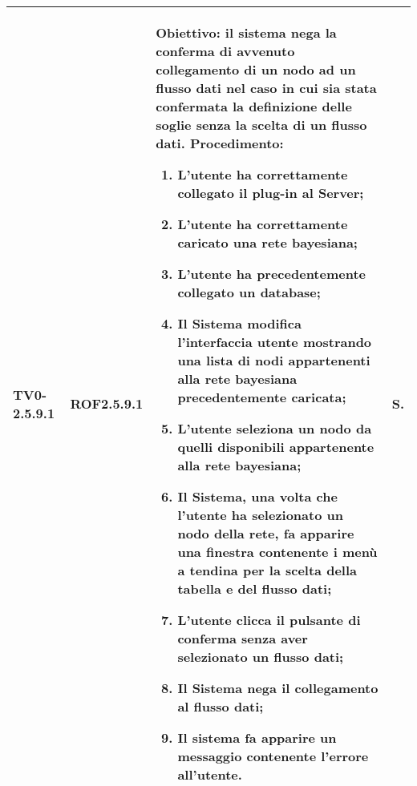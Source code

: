 \begin{longtable}{|C{.15\textwidth}|C{.13\textwidth}|m{.65\textwidth}|C{.08\textwidth}|}
TV0-2.5.9.1 & ROF2.5.9.1  &
	\textbf{Obiettivo}: il sistema nega la conferma di avvenuto collegamento di un nodo ad un flusso dati nel caso in cui sia stata confermata la definizione delle soglie senza la scelta di un flusso dati. \newline
	\textbf{Procedimento}:
	\begin{enumerate}
		\item L'utente ha correttamente collegato il plug-in al Server;
		\item L'utente ha correttamente caricato una rete bayesiana;
		\item L'utente ha precedentemente collegato un database;
		\item Il Sistema modifica l'interfaccia utente mostrando una lista di nodi appartenenti alla rete bayesiana precedentemente caricata;
		\item L'utente seleziona un nodo da quelli disponibili appartenente alla rete bayesiana;
		\item Il Sistema, una volta che l'utente ha selezionato un nodo della rete, fa apparire una finestra contenente i menù a tendina per la scelta della tabella e del flusso dati;
		\item L'utente clicca il pulsante di conferma senza aver selezionato un flusso dati;
		\item Il Sistema nega il collegamento al flusso dati;
		\item Il sistema fa apparire un messaggio contenente l'errore all'utente.
	\end{enumerate}
	& S. \\
\hline


\end{longtable}
